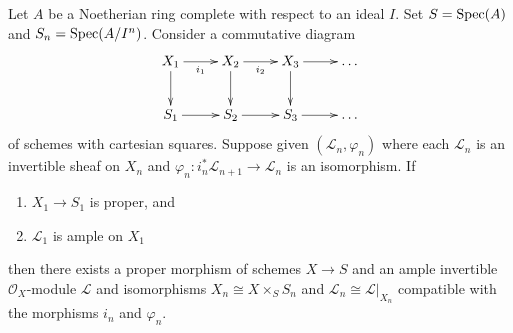 \begin{theorem}
\label{theorem-algebraization}
Let $A$ be a Noetherian ring complete with respect to an ideal $I$.
Set $S = \mathop{\mathrm{Spec}}(A)$ and $S_n = \mathop{\mathrm{Spec}}(A/I^n)$. Consider a commutative
diagram
$$
\xymatrix{
X_1 \ar[r]_{i_1} \ar[d] & X_2 \ar[r]_{i_2} \ar[d] & X_3 \ar[r] \ar[d] &
\ldots \\
S_1 \ar[r] & S_2 \ar[r] & S_3 \ar[r] & \ldots
}
$$
of schemes with cartesian squares. Suppose given $(\mathcal{L}_n, \varphi_n)$
where each $\mathcal{L}_n$ is an invertible sheaf on $X_n$ and
$\varphi_n : i_n^*\mathcal{L}_{n + 1} \to \mathcal{L}_n$
is an isomorphism. If
\begin{enumerate}
\item $X_1 \to S_1$ is proper, and
\item $\mathcal{L}_1$ is ample on $X_1$
\end{enumerate}
then there exists a proper morphism of schemes $X \to S$
and an ample invertible $\mathcal{O}_X$-module $\mathcal{L}$
and isomorphisms $X_n \cong X \times_S S_n$ and
$\mathcal{L}_n \cong \mathcal{L}|_{X_n}$ compatible with
the morphisms $i_n$ and $\varphi_n$.
\end{theorem}

